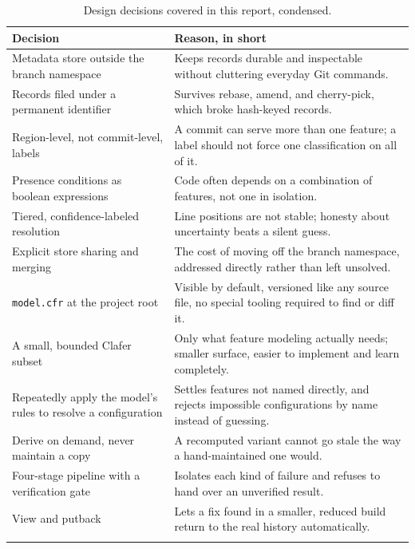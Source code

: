 \documentclass[11pt]{article}
\begin{document}
\begin{longtable}{@{}p{}p{}@{}}
\toprule
\textbf{Decision} & \textbf{Reason, in short} \\
\midrule
\endhead
Metadata store outside the branch namespace & Keeps records durable and
  inspectable without cluttering everyday Git commands. \\
Records filed under a permanent identifier & Survives rebase, amend, and
  cherry-pick, which broke hash-keyed records. \\
Region-level, not commit-level, labels & A commit can serve more than one
  feature; a label should not force one classification on all of it. \\
Presence conditions as boolean expressions & Code often depends on a
  combination of features, not one in isolation. \\
Tiered, confidence-labeled resolution & Line positions are not stable;
  honesty about uncertainty beats a silent guess. \\
Explicit store sharing and merging & The cost of moving off the branch
  namespace, addressed directly rather than left unsolved. \\
\texttt{model.cfr} at the project root & Visible by default, versioned
  like any source file, no special tooling required to find or diff it. \\
A small, bounded Clafer subset & Only what feature modeling actually
  needs; smaller surface, easier to implement and learn completely. \\
Repeatedly apply the model's rules to resolve a configuration & Settles
  features not named directly, and rejects impossible configurations by
  name instead of guessing. \\
Derive on demand, never maintain a copy & A recomputed variant cannot go
  stale the way a hand-maintained one would. \\
Four-stage pipeline with a verification gate & Isolates each kind of
  failure and refuses to hand over an unverified result. \\
View and putback & Lets a fix found in a smaller, reduced build return to
  the real history automatically. \\
\bottomrule
\caption{Design decisions covered in this report, condensed.}
\end{longtable}
\end{document}

